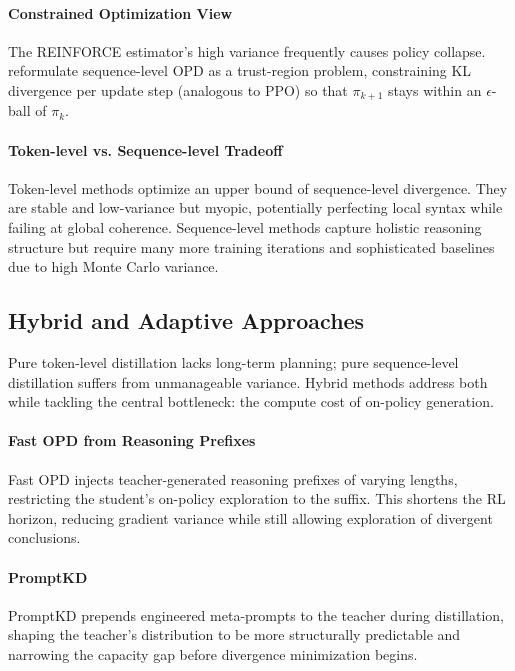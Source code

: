 \documentclass{article} %
\begin{document}
\paragraph{Constrained Optimization View}
The REINFORCE estimator's high variance frequently causes policy collapse. \citet{2509.22921} reformulate sequence-level OPD as a trust-region problem, constraining KL divergence per update step (analogous to PPO) so that $\pi_{k+1}$ stays within an $\epsilon$-ball of $\pi_k$.

\paragraph{Token-level vs. Sequence-level Tradeoff}
Token-level methods optimize an upper bound of sequence-level divergence. They are stable and low-variance but myopic, potentially perfecting local syntax while failing at global coherence. Sequence-level methods capture holistic reasoning structure but require many more training iterations and sophisticated baselines due to high Monte Carlo variance.

\subsection{Hybrid and Adaptive Approaches}
\label{subsec:hybrid}

Pure token-level distillation lacks long-term planning; pure sequence-level distillation suffers from unmanageable variance. Hybrid methods address both while tackling the central bottleneck: the compute cost of on-policy generation.

\paragraph{Fast OPD from Reasoning Prefixes}
Fast OPD \citep{2602.15260} injects teacher-generated reasoning prefixes of varying lengths, restricting the student's on-policy exploration to the suffix. This shortens the RL horizon, reducing gradient variance while still allowing exploration of divergent conclusions.

\paragraph{PromptKD}
PromptKD \citep{2402.12842} prepends engineered meta-prompts to the teacher during distillation, shaping the teacher's distribution to be more structurally predictable and narrowing the capacity gap before divergence minimization begins.
\end{document}
